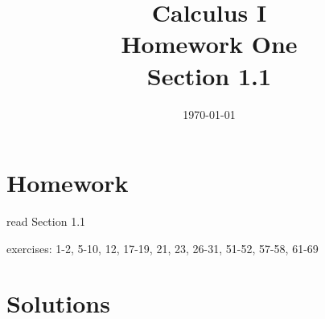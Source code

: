 \documentclass[letterpaper]{exam}
\title{Calculus I \\ Homework One \\ Section 1.1}
\author{}
\date{\today}
\begin{document}
  \maketitle

  \section{Homework}
    \begin{itemize*}
      \item read Section 1.1
      \item exercises: 1-2, 5-10, 12, 17-19, 21, 23, 26-31, 51-52, 57-58, 61-69
    \end{itemize*}

  \ifprintanswers
    \section{Solutions}
\end{document}
